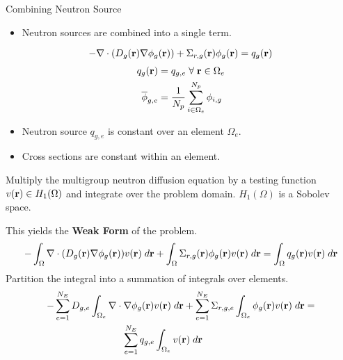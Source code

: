\begin{frame}{Combining Neutron Source}
  \begin{itemize}
    \item Neutron sources are combined into a single term.
  \end{itemize}
  \begin{equation}
    \label{eq:multigroup_source}
    - \mathbf{\nabla} \cdot( D_g(\mathbf{r}) \mathbf{\nabla} \phi_g(\mathbf{r})) + \Sigma_{r,g}(\mathbf{r}) \phi_g(\mathbf{r}) = 
      q_g(\mathbf{r})
  \end{equation}
  \begin{align}
    q_g(\mathbf{r}) &= q_{g,e} \; \forall \; \mathbf{r} \in \Omega_e \\
    \overline{\phi}_{g,e} &= \frac{1}{N_p} \sum_{i \in \Omega_e}^{N_p} \phi_{i,g}
  \end{align}

  \begin{itemize}
    \item Neutron source $q_{g,e}$ is constant over an element $\Omega_e$.
    \item Cross sections are constant within an element.
  \end{itemize}
\end{frame}

\begin{frame}{}
  Multiply the multigroup neutron diffusion equation by a testing function
  $v(\mathbf{r}) \in H_1(\Omega)$ and integrate over the problem domain. $H_1(\Omega)$
  is a Sobolev space.
  
  \vspace{0.25in}
  This yields the \textbf{Weak Form} of the problem.
  \begin{equation}
    \label{eq:fem_weak_form}
    - \int_{\Omega} \mathbf{\nabla} \cdot (D_g(\mathbf{r}) \mathbf{\nabla} \phi_g(\mathbf{r})) v(\mathbf{r}) \; d\mathbf{r}
      + \int_{\Omega} \Sigma_{r,g}(\mathbf{r}) \phi_g(\mathbf{r}) v(\mathbf{r}) \;d\mathbf{r} =
      \int_{\Omega} q_g(\mathbf{r}) v(\mathbf{r}) \;d\mathbf{r}
  \end{equation}
  Partition the integral into a summation of integrals over elements.
  \begin{multline}
    \label{eq:element_by_element}
    -\sum_{e=1}^{N_E} D_{g,e} 
      \int_{\Omega_e} \mathbf{\nabla} \cdot \mathbf{\nabla} \phi_g(\mathbf{r}) v(\mathbf{r}) \; d\mathbf{r} +
      \sum_{e=1}^{N_E} \Sigma_{r,g,e} \int_{\Omega_e} \phi_g(\mathbf{r}) v(\mathbf{r}) 
      \;d\mathbf{r} = 
    \\
      \sum_{e=1}^{N_E} q_{g,e} \int_{\Omega_e} v(\mathbf{r}) 
      \; d\mathbf{r} \hspace{0.5in}
  \end{multline}
\end{frame}

